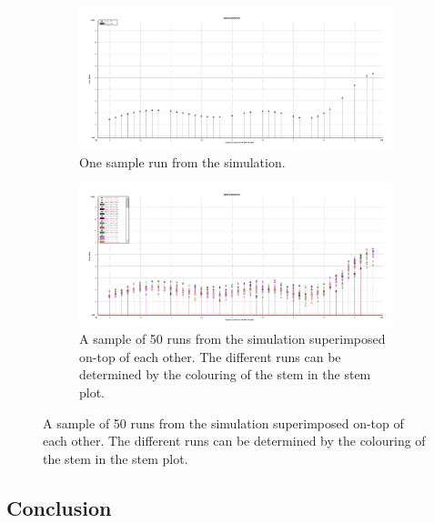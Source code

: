 \begin{figure}[!h]
    \centering
    \caption{Sample outputs from the VPI simulator.}
    \label{fig:tw:vpi_samp_op}
    \begin{subfigure}{\textwidth}
        \centering
        \caption{One sample run from the simulation.}
        \includegraphics[width=\textwidth]{images/technical_work/section_2_data generation/sample_output_1.pdf}
        
        \label{fig:tw:vpi_1_op}
    \end{subfigure}
    
    \begin{subfigure}{\textwidth}
        \centering
        \caption{A sample of 50 runs from the simulation superimposed on-top of each other. The different runs can be determined by the colouring of the stem in the stem plot.}
        \includegraphics[width=\textwidth]{images/technical_work/section_2_data generation/sample_output_50.pdf}
        
        \label{fig:tw:vpi_50_op}
    \end{subfigure}
\end{figure}
\FloatBarrier
\subsection{Conclusion}

